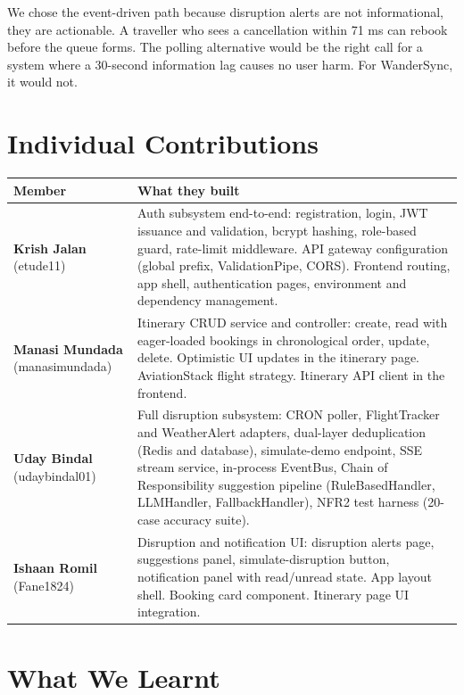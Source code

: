 \documentclass[12pt,a4paper]{article}
\begin{document}
We chose the event-driven path because disruption alerts are not informational, they are
actionable. A traveller who sees a cancellation within 71 ms can rebook before the queue forms.
The polling alternative would be the right call for a system where a 30-second information lag
causes no user harm. For WanderSync, it would not.

\section{Individual Contributions}

\begin{tabularx}{\textwidth}{@{}lX@{}}
\toprule
\textbf{Member} & \textbf{What they built} \\
\midrule
\textbf{Krish Jalan} (etude11) &
  Auth subsystem end-to-end: registration, login, JWT issuance and validation, bcrypt hashing,
  role-based guard, rate-limit middleware. API gateway configuration (global prefix,
  ValidationPipe, CORS). Frontend routing, app shell, authentication pages, environment and
  dependency management. \\[0.5em]
\textbf{Manasi Mundada} (manasimundada) &
  Itinerary CRUD service and controller: create, read with eager-loaded bookings in
  chronological order, update, delete. Optimistic UI updates in the itinerary page. AviationStack
  flight strategy. Itinerary API client in the frontend. \\[0.5em]
\textbf{Uday Bindal} (udaybindal01) &
  Full disruption subsystem: CRON poller, FlightTracker and WeatherAlert adapters, dual-layer
  deduplication (Redis and database), simulate-demo endpoint, SSE stream service, in-process
  EventBus, Chain of Responsibility suggestion pipeline (RuleBasedHandler, LLMHandler,
  FallbackHandler), NFR2 test harness (20-case accuracy suite). \\[0.5em]
\textbf{Ishaan Romil} (Fane1824) &
  Disruption and notification UI: disruption alerts page, suggestions panel,
  simulate-disruption button, notification panel with read/unread state. App layout shell.
  Booking card component. Itinerary page UI integration. \\
\bottomrule
\end{tabularx}

\section{What We Learnt}
\end{document}
